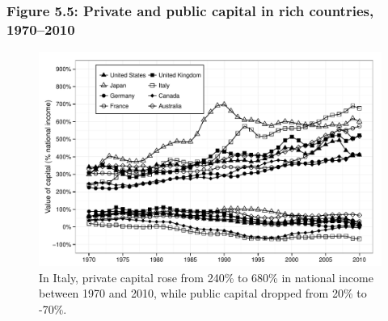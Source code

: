 \documentclass[t]{beamer}\usepackage[]{graphicx}\usepackage[]{color}
\newenvironment{knitrout}{}{} %
\begin{document}
\begin{frame}[label=Figure_5_5]
\frametitle{Figure 5.5: Private and public capital in rich countries, 1970--2010}
\begin{figure}[t]
\begin{minipage}[b]{\textwidth}
\centering
\begin{knitrout}\footnotesize
{}\color{fgcolor}

{\centering \includegraphics[width=1\linewidth]{figures/bw/Figure_5_5} 

}



\end{knitrout}
\caption{In Italy, private capital rose from 240\% to 680\% in national income between 1970 and 2010, while public capital dropped from 20\% to -70\%.}
\end{minipage}
\end{figure}
\end{frame}
\end{document}
